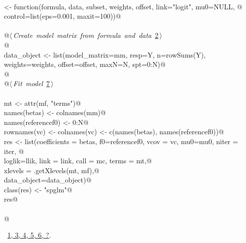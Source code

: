 \documentclass[reqno]{amsart}
\renewcommand{\NWlink}[2]{\hyperlink{#1}{#2}}
\begin{document}
\begin{flushleft}
\begin{list}{}{}
\mbox{}\verb@@\\
\mbox{}\verb@spglm <- function(formula, data, subset, weights, offset, link="logit", mu0=NULL, @\\
\mbox{}\verb@                  control=list(eps=0.001, maxit=100)){@\\
\mbox{}\verb@@\\
\mbox{}\verb@    @\hbox{$\langle\,${\itshape Create model matrix from formula and data}\nobreak\ {\footnotesize \NWlink{nuweb2}{2}}$\,\rangle$}\verb@@\\
\mbox{}\verb@    @\\
\mbox{}\verb@    data_object <- list(model_matrix=mm, resp=Y, n=rowSums(Y), weights=weights, offset=offset, maxN=N, spt=0:N)@\\
\mbox{}\verb@    @\\
\mbox{}\verb@    @\hbox{$\langle\,${\itshape Fit model}\nobreak\ {\footnotesize \NWlink{nuweb7}{7}}$\,\rangle$}\verb@@\\
\mbox{}\verb@@\\
\mbox{}\verb@    mt <- attr(mf, "terms")@\\
\mbox{}\verb@    names(betas) <- colnames(mm)@\\
\mbox{}\verb@    names(referencef0) <- 0:N@\\
\mbox{}\verb@    rownames(vc) <- colnames(vc) <- c(names(betas), names(referencef0))@\\
\mbox{}\verb@    res <- list(coefficients = betas, f0=referencef0, vcov = vc, mu0=mu0, niter = iter, @\\
\mbox{}\verb@                loglik=llik, link = link, call = mc, terms = mt,@\\
\mbox{}\verb@                xlevels = .getXlevels(mt, mf),@\\
\mbox{}\verb@                data_object=data_object)@\\
\mbox{}\verb@    class(res) <- "spglm"@\\
\mbox{}\verb@    res@\\
\mbox{}\verb@@\\
\mbox{}\verb@}@\\
\mbox{}\verb@@{\NWsep}
\end{list}
\vspace{-1.5ex}
\footnotesize
\begin{list}{}{\setlength{\itemsep}{-\parsep}\setlength{\itemindent}{-\leftmargin}}
\item \NWtxtFileDefBy\ \NWlink{nuweb1}{1}\NWlink{nuweb3}{, 3}\NWlink{nuweb4}{, 4}\NWlink{nuweb5}{, 5}\NWlink{nuweb6}{, 6}\NWlink{nuweb?}{, ?}.

\item{}
\end{list}
\vspace{4ex}
\end{flushleft}
\end{document}
